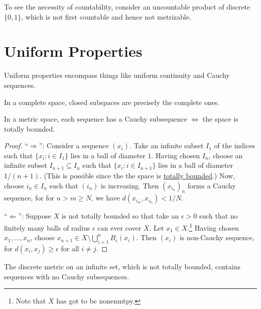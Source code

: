 	\begin{rmk}
		To see the necessity of countability, consider an uncountable product of discrete $\{0, 1\}$, which is not first countable and hence not metrizable.
	\end{rmk}
	

	
	

\section{Uniform Properties}

Uniform properties encompass things like uniform continuity and Cauchy sequences.


	\begin{lem}\label{LEM: closed subsets in complete spaces}
		In a complete space, closed subspaces are precisely the complete ones.
	\end{lem}
	
	
	\begin{lem}\label{LEM: totally bdd iff each seq has a Cauchy subseq}
		In a metric space, each sequence has a Cauchy subsequence $\iff$ the space is totally bounded.
	\end{lem}
	
	\begin{proof}
		``$\Rightarrow$'': Consider a sequence $(x_i)$. Take an infinite subset $I_1$ of the indices such that $\{x_i : i\in I_1\}$ lies in a ball of diameter $1$. Having chosen $I_n$, choose
		an infinite subset $I_{n + 1}\subseteq I_n$ such that $\{x_i : i\in I_{n + 1}\}$ lies in a ball of diameter $1/(n + 1)$. (This is possible since the the space is \uline{totally bounded}.) Now, choose $i_n\in I_n$ such that $(i_n)$ is increasing. Then $(x_{i_n})_n$ forms a Cauchy sequence, for for $n > m\ge N$, we have $d(x_{i_m}, x_{i_n}) < 1/N$.
		
		``$\Leftarrow$'': Suppose $X$ is not totally bounded so that take an $\epsilon > 0$ such that no finitely many balls of radius $\epsilon$ can ever cover $X$. Let $x_1\in X$.\footnote{
			Note that $X$ has got to be nonenmtpy.}
		Having chosen $x_1, \ldots, x_n$, choose
		$x_{n + 1}\in X\setminus\bigcup_{i = 1}^n B_\epsilon(x_i)$. Then $(x_i)$ is non-Cauchy sequence, for $d(x_i, x_j)\ge \epsilon$ for all $i\ne j$.
	\end{proof}
	
	\begin{rmk}
		The discrete metric on an infinite set, which is not totally bounded, contains sequences with no Cauchy subsequences.
	\end{rmk}



